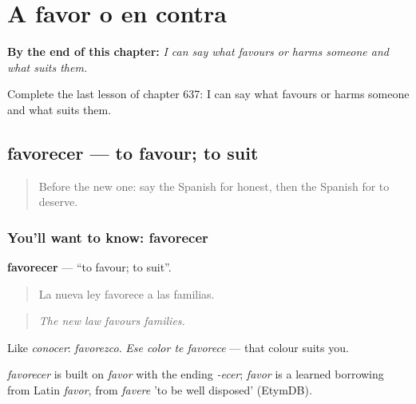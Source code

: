 
\chapter{A favor o en contra}
\label{ch:es-a-favor-o-en-contra}

\begin{chapteropening}
\textbf{By the end of this chapter:} \emph{I can say what favours or harms someone and what suits them.}

Complete the last lesson of chapter 637: I can say what favours or harms someone and what suits them.
\end{chapteropening}

\section[favorecer]{favorecer — to favour; to suit}

\label{lesson:ES-C637-favorecer}



\begin{quote}
Before the new one: say the Spanish for honest, then the Spanish for to deserve.
\end{quote}

\subsection*{You'll want to know: favorecer}
\textbf{favorecer} — \textquotedblleft{}to favour; to suit\textquotedblright{}.

\begin{quote}
La nueva ley favorece a las familias.
\end{quote}

\begin{quote}
\emph{The new law favours families.}
\end{quote}

Like \emph{conocer}: \emph{favorezco}. \emph{Ese color te favorece} — that colour suits you.

\begin{cousinweb}
\emph{favorecer} is built on \emph{favor} with the ending \emph{-ecer}; \emph{favor} is a learned borrowing from Latin \emph{favor}, from \emph{favere} 'to be well disposed' (EtymDB).
\end{cousinweb}

